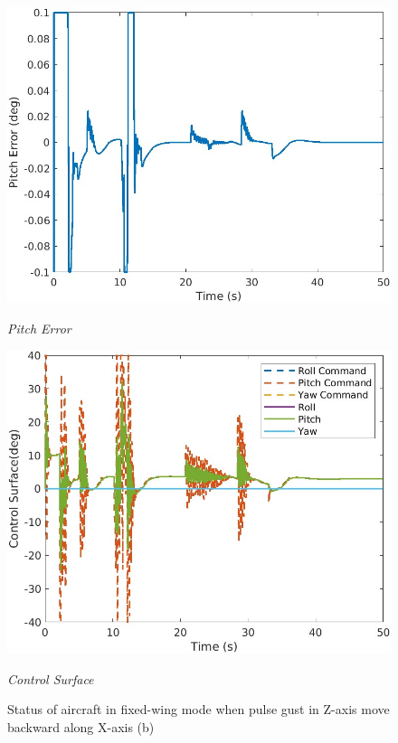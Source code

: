 \begin{figure}[htbp]
  \begin{minipage}[b]{0.45\textwidth}
    \centering
    \includegraphics[width=\textwidth]{Images/Control Surface Analysis/7 PitchEror_1.jpg}
    \caption*{\textit{Pitch Error}}
  \end{minipage}
  \hfil
  \begin{minipage}[b]{0.45\textwidth}
    \centering
    \includegraphics[width=\textwidth]{Images/Control Surface Analysis/8 ControlSurface_1.jpg}
    \caption*{\textit{Control Surface}}
  \end{minipage}
  \caption{Status of aircraft in fixed-wing mode when pulse gust in Z-axis move backward along X-axis (b)}
  \label{fig:Control Surface Analysis 2}
\end{figure}

